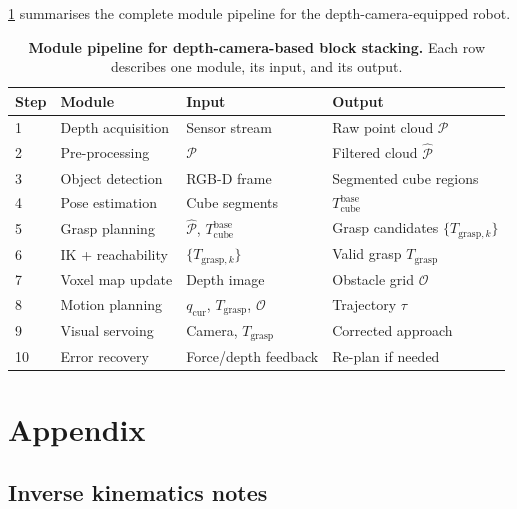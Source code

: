 \documentclass{article}
\begin{document}
\cref{tab:pipeline} summarises the complete module pipeline for the depth-camera-equipped
robot.

\begin{table}[t!]
    \caption{\textbf{Module pipeline for depth-camera-based block stacking.}
             Each row describes one module, its input, and its output.}
    \label{tab:pipeline}
    \centering
    \small
    \begin{tabular}{llll}
        \toprule
        \textbf{Step} & \textbf{Module} & \textbf{Input} & \textbf{Output} \\
        \midrule
        1 & Depth acquisition     & Sensor stream            & Raw point cloud $\mathcal{P}$ \\
        2 & Pre-processing        & $\mathcal{P}$            & Filtered cloud $\hat{\mathcal{P}}$ \\
        3 & Object detection      & RGB-D frame              & Segmented cube regions \\
        4 & Pose estimation       & Cube segments            & $T_{\text{cube}}^{\text{base}}$ \\
        5 & Grasp planning        & $\hat{\mathcal{P}}$, $T_{\text{cube}}^{\text{base}}$ & Grasp candidates $\{T_{\text{grasp},k}\}$ \\
        6 & IK + reachability     & $\{T_{\text{grasp},k}\}$ & Valid grasp $T_{\text{grasp}}$ \\
        7 & Voxel map update      & Depth image              & Obstacle grid $\mathcal{O}$ \\
        8 & Motion planning       & $q_{\text{cur}}$, $T_{\text{grasp}}$, $\mathcal{O}$ & Trajectory $\tau$ \\
        9 & Visual servoing       & Camera, $T_{\text{grasp}}$ & Corrected approach \\
       10 & Error recovery        & Force/depth feedback     & Re-plan if needed \\
        \bottomrule
    \end{tabular}
\end{table}




\appendix
\section{Appendix}

\subsection{Inverse kinematics notes}
\end{document}
